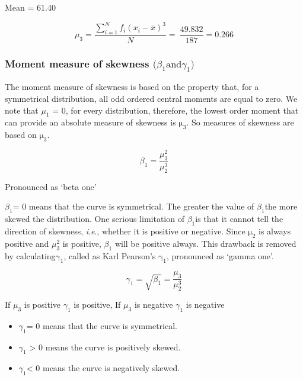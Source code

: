 \documentclass[
]{book}
\begin{document}
Mean = 61.40

\[\mu_{3} = \frac{\sum_{i = 1}^{N}{f_{i}\left( x_{i} - \overline{x} \right)^{3}}}{N} = \ \frac{49.832}{187} = 0.266\]

\subsubsection{\texorpdfstring{Moment measure of skewness \(\mathbf{(}\beta_{1}\text{and}\)\(\gamma_{1}\mathbf{)}\)}{Moment measure of skewness \textbackslash mathbf\{(\}\textbackslash beta\_\{1\}\textbackslash text\{and\}\textbackslash gamma\_\{1\}\textbackslash mathbf\{)\}}}\label{moment-measure-of-skewness-mathbfbeta_1textandgamma_1mathbf}

The moment measure of skewness is based on the property that, for a symmetrical distribution, all odd ordered central moments are equal to zero. We note that \(\mu_{1}\) = 0, for every distribution, therefore, the lowest order moment that can provide an absolute measure of skewness is \(\text{μ}_{3}\). So measures of skewness are based on \(\text{μ}_{3}\).

\[\beta_{1} = \frac{\mu_{3}^{2}}{\mu_{2}^{3}}\]

Pronounced as `beta one'

\(\beta_{1}\)= 0 means that the curve is symmetrical. The greater the value of \(\beta_{1}\)the more skewed the distribution. One serious limitation of \(\beta_{1}\)is that it cannot tell the direction of skewness, \emph{i}.\emph{e}., whether it is positive or negative. Since \(\text{μ}_{2}\) is always positive and \(\mu_{3}^{2}\) is positive, \(\beta_{1}\) will be positive always. This drawback is removed by calculating\(\text{γ}_{1}\), called as Karl Pearson's\(\text{ γ}_{1}\), pronounced as `gamma one'.

\[\gamma_{1} = \sqrt{\beta_{1}} = \frac{\mu_{3}}{\mu_{2}^{3}}\]

If \(\mu_{3}\) is positive \(\gamma_{1}\) is positive, If \(\mu_{3}\) is negative \(\gamma_{1}\) is negative

\begin{itemize}
\item
  \(\gamma_{1}\)= 0 means that the curve is symmetrical.
\item
  \(\gamma_{1}\) \textgreater{} 0 means the curve is positively skewed.
\item
  \(\gamma_{1}\)\textless{} 0 means the curve is negatively skewed.
\end{itemize}
\end{document}
